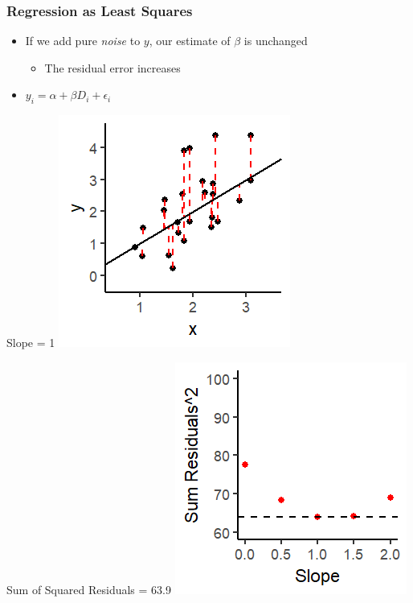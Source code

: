 \documentclass[xcolor=x11names,compress]{beamer}\usepackage[]{graphicx}\usepackage[]{color}
\makeatletter
\def\maxwidth{ %
  \ifdim\Gin@nat@width>\linewidth
    \linewidth
  \else
    \Gin@nat@width
  \fi
}
\newenvironment{knitrout}{}{} %
\renewcommand{\(}{\begin{columns}}
\renewcommand{\)}{\end{columns}}
\newcommand{\<}[1]{\begin{column}{#1}}
\renewcommand{\>}{\end{column}}
\makeatother
\begin{document}
\begin{frame}
\frametitle{Regression as Least Squares}
\begin{itemize}
\item If we add pure \textit{noise} to $y$, our estimate of $\beta$ is unchanged
\begin{itemize}
\item The residual error increases
\end{itemize}
\item $y_i = \alpha + \beta D_i + \epsilon_i$
\end{itemize}
\begin{multicols}{2}
Slope = 1
\begin{knitrout}
\color{fgcolor}
\includegraphics[width=\maxwidth]{figure/graph_ols7-1} 

\end{knitrout}
\columnbreak
Sum of Squared Residuals = 63.9
\begin{knitrout}
\color{fgcolor}
\includegraphics[width=\maxwidth]{figure/graph_ssr7-1} 

\end{knitrout}
\end{multicols}
\end{frame}
\end{document}
